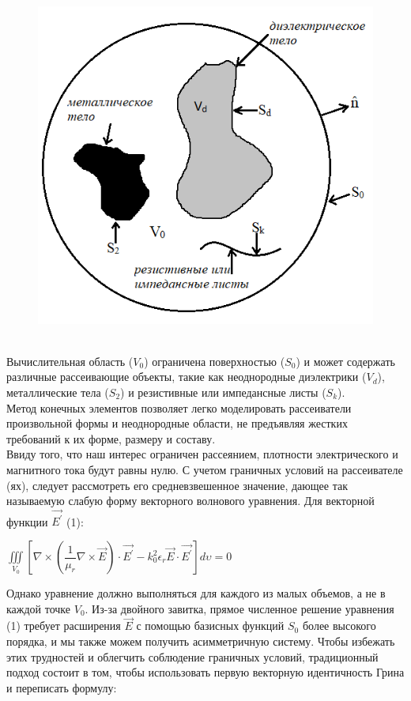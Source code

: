 \begin{figure}[h]
	\centering
	\includegraphics[width=0.6\linewidth]{tes2}
	\caption{}
	\label{fig:tes2}
\end{figure}
\\
Вычислительная область ($ V_{0} $) ограничена поверхностью ($ S_{0} $) и может содержать различные рассеивающие объекты, такие как неоднородные диэлектрики ($ V_{d} $), металлические тела ($ S_{2} $) и резистивные или импедансные листы ($ S_{k} $).\\
Метод конечных элементов позволяет легко моделировать рассеиватели произвольной формы и неоднородные области, не предъявляя жестких требований к их форме, размеру и составу.  \\
Ввиду того, что наш интерес ограничен рассеянием, плотности электрического и магнитного тока будут равны нулю.
С учетом граничных условий на рассеивателе (ях), следует рассмотреть его средневзвешенное значение, дающее так называемую слабую форму векторного волнового уравнения. Для векторной функции $ \vec{E^{'}} $ (1):\\
\begin{center}
	$ 	\iiint\limits_{V_{0}}^{} \left[ \nabla \times \left( \dfrac{1}{\mu_{r}}\nabla \times \vec{E}\right)\cdot \vec{E^{'}} - k_{0}^{2} \epsilon_{r}\vec{E} \cdot \vec{E^{'}} \right]d\upsilon = 0 $
\end{center}
Однако уравнение должно выполняться для каждого из малых объемов, а не в каждой точке $ V_{0} $. Из-за двойного завитка, прямое численное решение уравнения (1) требует расширения $ \vec{E} $ с помощью базисных функций $ S_{0} $ более высокого порядка, и мы также можем получить асимметричную систему. Чтобы избежать этих трудностей и облегчить соблюдение граничных условий, традиционный подход состоит в том, чтобы использовать первую векторную идентичность Грина и переписать формулу: \\

